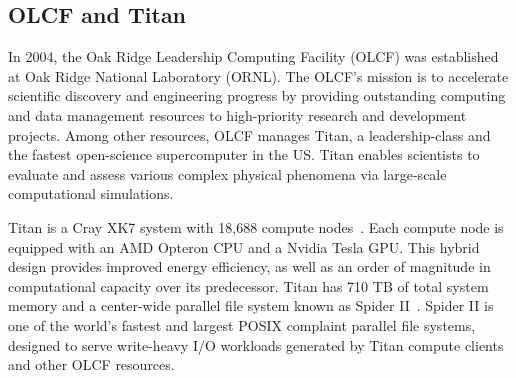 \subsection{OLCF and Titan}

In 2004, the Oak Ridge Leadership Computing Facility (OLCF) was established at
Oak Ridge National Laboratory (ORNL). The OLCF's mission is to accelerate
scientific discovery and engineering progress by providing outstanding computing
and data management resources to high-priority research and development
projects. Among other resources, OLCF manages Titan, a leadership-class and the
fastest open-science supercomputer in the US. Titan enables scientists to
evaluate and assess various complex physical phenomena via large-scale
computational simulations.

Titan is a Cray XK7 system with 18,688 compute nodes~\cite{top500}. Each compute
node is equipped with an AMD Opteron CPU and a Nvidia Tesla GPU. This hybrid
design provides improved energy efficiency, as well as an order of magnitude in
computational capacity over its predecessor. Titan has 710 TB of total system
memory and a center-wide parallel file system known as Spider II~\cite{spider2}.
Spider II is one of the world's fastest and largest POSIX complaint parallel
file systems, designed to serve write-heavy I/O workloads generated by Titan
compute clients and other OLCF resources.
